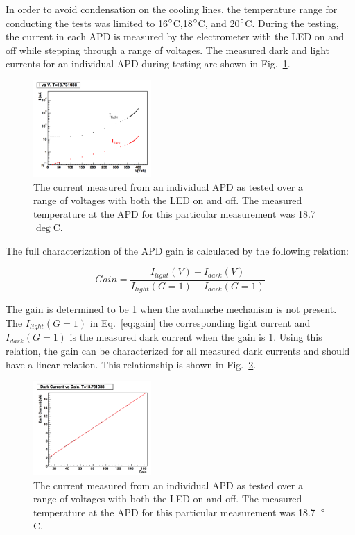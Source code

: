 In order to avoid condensation on the cooling lines, the temperature range for conducting the tests was limited to 16$\degree$C,18$\degree$C, and 20$\degree$C. During the testing, the current in each APD is measured by the electrometer with the LED on and off while stepping through a range of voltages. The measured dark and light currents for an individual APD during testing are shown in Fig.~\ref{Figure:apdcurrent}.

\begin{figure}[H]
  \centering
      \includegraphics[width=0.4\textwidth]{pics/experiment/apdcurrent.png}
  \caption[APD current draw versus voltage with LED on and off]{The current measured from an individual APD as tested over a range of voltages with both the LED on and off. The measured temperature at the APD for this particular measurement was 18.7~$\deg$C.}
  \label{Figure:apdcurrent}
\end{figure}

The full characterization of the APD gain is calculated by the following relation:

\begin{equation}
	\label{eq:apdgain}
	Gain = \dfrac{I_{light}(V)-I_{dark}(V)}{I_{light}(G=1)-I_{dark}(G=1)} 
\end{equation}

The gain is determined to be 1 when the avalanche mechanism is not present. The $I_{light}(G=1)$ in Eq.~\eqref{eq:gain} the corresponding light current and $I_{dark}(G=1)$ is the measured dark current when the gain is 1. Using this relation, the gain can be characterized for all measured dark currents and should have a linear relation. This relationship is shown in Fig.~\ref{Figure:apdIvG}.

\begin{figure}[H]
  \centering
      \includegraphics[width=0.4\textwidth]{pics/experiment/apdIvG.png}
  \caption[APD measured dark current as a function of gain]{The current measured from an individual APD as tested over a range of voltages with both the LED on and off. The measured temperature at the APD for this particular measurement was 18.7~$\degree$C.}
  \label{Figure:apdIvG}
\end{figure}

